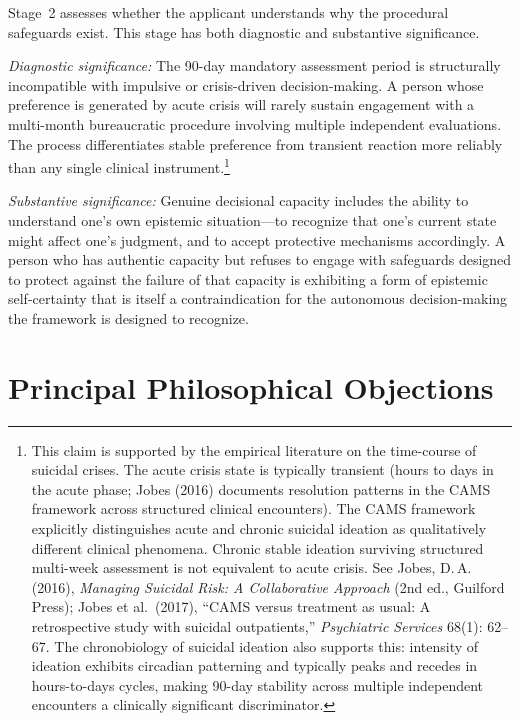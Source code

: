 \documentclass[11pt, letterpaper]{article}
\begin{document}
Stage~2 assesses whether the applicant understands why the procedural safeguards exist.
This stage has both diagnostic and substantive significance.

\textit{Diagnostic significance:} The 90-day mandatory assessment period is structurally
incompatible with impulsive or crisis-driven decision-making. A person whose preference
is generated by acute crisis will rarely sustain engagement with a multi-month
bureaucratic procedure involving multiple independent evaluations. The process
differentiates stable preference from transient reaction more reliably than any single
clinical instrument.\footnote{%
  This claim is supported by the empirical literature on the time-course of suicidal
  crises. The acute crisis state is typically transient (hours to days in the acute
  phase; Jobes (2016) documents resolution patterns in the CAMS framework across
  structured clinical encounters). The CAMS framework explicitly distinguishes acute
  and chronic suicidal ideation as qualitatively different clinical phenomena. Chronic
  stable ideation surviving structured multi-week assessment is not equivalent to acute
  crisis. See Jobes, D.\,A. (2016), \textit{Managing Suicidal Risk: A Collaborative
  Approach} (2nd ed., Guilford Press); Jobes et al.\ (2017), ``CAMS versus treatment
  as usual: A retrospective study with suicidal outpatients,'' \textit{Psychiatric
  Services} 68(1): 62--67. The chronobiology of suicidal ideation also supports this:
  intensity of ideation exhibits circadian patterning and typically peaks and recedes
  in hours-to-days cycles, making 90-day stability across multiple independent encounters
  a clinically significant discriminator.}

\textit{Substantive significance:} Genuine decisional capacity includes the ability to
understand one's own epistemic situation---to recognize that one's current state might
affect one's judgment, and to accept protective mechanisms accordingly. A person who
has authentic capacity but refuses to engage with safeguards designed to protect
against the failure of that capacity is exhibiting a form of epistemic self-certainty
that is itself a contraindication for the autonomous decision-making the framework
is designed to recognize.

\section{Principal Philosophical Objections}
\end{document}
